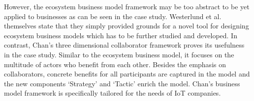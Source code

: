 		However, the ecosystem business model framework may be too abstract to be yet applied to businesses as can be seen in the case study. Westerlund et al. themselves state that they simply provided grounds for a novel tool for designing ecosystem business models which has to be further studied and developed. In contrast, Chan's three dimensional collaborator framework proves its usefulness in the case study. Similar to the ecosystem business model, it focuses on the multitude of actors who benefit from each other. Besides the emphasis on collaborators, concrete benefits for all participants are captured in the model and the new components `Strategy' and `Tactic' enrich the model. Chan's business model framework is specifically tailored for the needs of IoT companies.
	\vspace{-2em}

